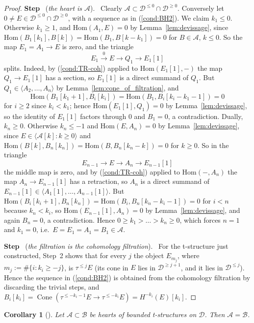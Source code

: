 \documentclass[12pt]{amsart}
\newcommand{\condref}[1]{\textup{(\ref{#1})}}
\newtheorem{corollary}[theorem]{Corollary}
\numberwithin{theorem}{section}
\theoremstyle{definition}
\newcounter{pstep}
\newcommand{\step}[1]{\par\medskip\noindent\refstepcounter{pstep}\textbf{Step \thepstep}\ (\textit{#1}).\ \ignorespaces}
\newcommand{\calA}{\mathcal{A}}
\newcommand{\calB}{\mathcal{B}}
\newcommand{\Hom}{\mathrm{Hom}}
\newcommand{\calD}{\mathcal{D}}
\newcommand{\Dle}[1]{\calD^{\leqslant #1}}
\newcommand{\Dge}[1]{\calD^{\geqslant #1}}
\newcommand{\Cone}{\operatorname{Cone}}
\begin{document}
\begin{proof}
		\step{the heart is $\calA$}
		Clearly $\calA \subset \Dle{0} \cap \Dge{0}$.
		Conversely let $0 \neq E \in \Dle{0} \cap \Dge{0}$, with a sequence as in \condref{cond:BH2}.
		We claim $k_1 \leqslant 0$.
		Otherwise $k_1 \geqslant 1$, and $\Hom(A_1, E) = 0$ by Lemma~\ref{lem:devissage}, since $\Hom(B_1[k_1], B[k]) = \Hom(B_1, B[k - k_1]) = 0$ for $B \in \calA$, $k \leqslant 0$.
		So the map $E_1 = A_1 \to E$ is zero, and the triangle 
		\[
		E_1 \xrightarrow{0} E \to Q_1 \to E_1[1]
		\] 
		splits.
		Indeed, by \condref{cond:TR-coh} applied to $\Hom(E_1[1], -)$ the map $Q_1 \to E_1[1]$ has a section, so $E_1[1]$ is a direct summand of $Q_1$.
		But $Q_1 \in \langle A_2, \ldots, A_n \rangle$ by Lemma~\ref{lem:cone_of_filtration}, and 
		\[
		\Hom(B_1[k_1 + 1], B_i[k_i]) = \Hom(B_1, B_i[k_i - k_1 - 1]) = 0
		\] 
		for $i \geqslant 2$ since $k_i < k_1$;
		hence $\Hom(E_1[1], Q_1) = 0$ by Lemma~\ref{lem:devissage}, so the identity of $E_1[1]$ factors through $0$ and $B_1 = 0$, a contradiction.
		Dually, $k_n \geqslant 0$.
		Otherwise $k_n \leqslant -1$ and $\Hom(E, A_n) = 0$ by Lemma~\ref{lem:devissage}, since $E \in \langle \calA[k] : k \geqslant 0 \rangle$ and $\Hom(B[k], B_n[k_n]) = \Hom(B, B_n[k_n - k]) = 0$ for $k \geqslant 0$.
		So in the triangle 
		\[
		E_{n-1} \to E \to A_n \to E_{n-1}[1]
		\] 
		the middle map is zero, and by \condref{cond:TR-coh} applied to $\Hom(-, A_n)$ the map $A_n \to E_{n-1}[1]$ has a retraction, so $A_n$ is a direct summand of $E_{n-1}[1] \in \langle A_1[1], \ldots, A_{n-1}[1] \rangle$.
		But $\Hom(B_i[k_i + 1], B_n[k_n]) = \Hom(B_i, B_n[k_n - k_i - 1]) = 0$ for $i < n$ because $k_n < k_i$, so $\Hom(E_{n-1}[1], A_n) = 0$ by Lemma~\ref{lem:devissage}, and again $B_n = 0$, a contradiction.
		Hence $0 \geqslant k_1 > \ldots > k_n \geqslant 0$, which forces $n = 1$ and $k_1 = 0$, i.e.\ $E = E_1 = A_1 = B_1 \in \calA$.
		
		\step{the filtration is the cohomology filtration}
		For the t-structure just constructed, Step~2 shows that for every $j$ the object $E_{m_j}$, where $m_j := \#\{ i : k_i \geqslant -j \}$, is $\tau^{\leqslant j} E$ (its cone in $E$ lies in $\Dge{j+1}$, and it lies in $\Dle{j}$).
		Hence the sequence in \condref{cond:BH2} is obtained from the cohomology filtration by discarding the trivial steps, and $B_i[k_i] = \Cone(\tau^{\leqslant -k_i - 1} E \to \tau^{\leqslant -k_i} E) = H^{-k_i}(E)[k_i]$.
	\end{proof}
	
	\begin{corollary}[{\cite[Exercise~5.6]{MS17}}]
		\label{cor:hearts_inclusion}
		Let $\calA \subset \calB$ be hearts of bounded t-structures on $\calD$. Then $\calA = \calB$.
	\end{corollary}
	
\end{document}
